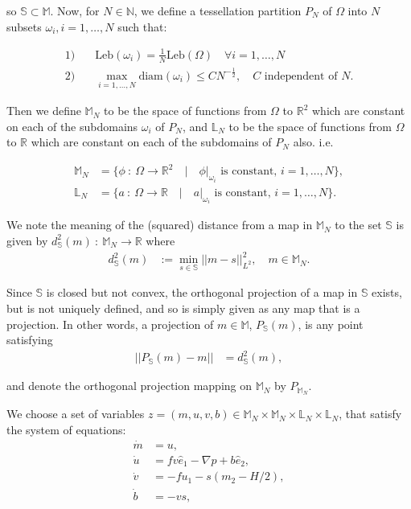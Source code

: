 \documentclass[11pt, oneside]{article}   	%
\newcommand{\R}{\mathbb{R}}
\newcommand{\MN}{\mathbb{M}_N}
\newcommand{\LN}{\mathbb{L}_N}
\newcommand{\dsmsq}{d^{2}_{\mathbb{S}}(m)}
\newcommand{\eone}{\hat{e}_1}
\newcommand{\etwo}{\hat{e}_2}
\newcommand{\M}{\mathbb{M}}
\newcommand{\N}{\mathbb{N}}
\newcommand{\Leb}{\mathrm{Leb}}
\begin{document}
so \(\mathbb{S} \subset \M\). Now, for \(N \in \N\), we define a tessellation partition \(P_N\) of \(\Omega\) into \(N\) subsets \(\omega_i, i=1,\dots,N\) such that:

\begin{align}
1)& \quad \Leb(\omega_i) = \frac{1}{N}\Leb(\Omega) \quad \forall i = 1,\dots,N \\
2)& \quad \max_{i = 1,\dots,N} \mathrm{diam}(\omega_i) \le CN^{-\frac{1}{2}}, \quad C \text{ independent of } N.
\end{align}

Then we define \(\MN\) to be the space of functions from \(\Omega\) to \(\R^2\) which are constant on each of the subdomains \(\omega_i\) of \(P_N\), and \(\LN\) to be the space of functions from  \(\Omega\) to \(\R\) which are constant on each of the subdomains of \(P_N\) also. i.e.

\begin{align}
\MN &= \{ \phi \: : \: \Omega \to \R^2 \quad | \quad \phi | _{\omega_i} \text{ is constant, } i = 1,\dots,N\}, \\
\LN &= \{ a \: : \: \Omega \to \R \quad | \quad a | _{\omega_i} \text{ is constant, } i = 1,\dots,N\}.
\end{align}

We note the meaning of the (squared) distance from a map in \(\MN\) to the set \(\mathbb{S}\) is given by \(\dsmsq \: : \: \MN \to \R\) where
\begin{align}
\dsmsq &:= \min_{s \in \mathbb{S}} || m - s || ^2_{L^2}, \quad m \in \MN.
\end{align}

Since \(\mathbb{S}\) is closed but not convex, the orthogonal projection of a map in \(\mathbb{S}\) exists, but is not uniquely defined, and so is simply given as any map that is a projection. In other words, a projection of \(m \in \mathbb{M}\), \(P_\mathbb{S}(m)\), is any point satisfying
\begin{align}
|| P_\mathbb{S}(m) - m || &= \dsmsq,
\end{align}

and denote the orthogonal projection mapping on \(\MN\) by \(P_{\MN}\).

We choose a set of variables \(z = (m, u, v, b) \in \MN \times \MN \times \LN \times \LN\), that satisfy the system of equations:
\begin{align} 
\dot{m} &= u, \\
\dot{u} &= f v \eone - \nabla p + b \etwo, \\
\dot{v} &= - f u_1 - s(m_2 - H/2), \\
\dot{b} &=  -vs,
\end{align}
\end{document}
